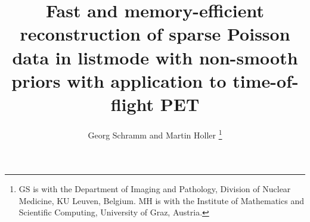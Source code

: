 \documentclass[lettersize,journal]{IEEEtran}
\begin{document}
\title{Fast and memory-efficient reconstruction of sparse Poisson data in listmode with non-smooth priors with application to time-of-flight PET}
\author{Georg Schramm and Martin Holler
\thanks{GS is with the Department of Imaging and Pathology, Division of Nuclear Medicine, KU Leuven, Belgium. 
MH is with the Institute of Mathematics and Scientific Computing, University of Graz, Austria.}}


\maketitle





\printbibliography
\end{document}
